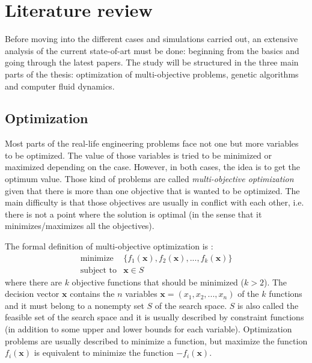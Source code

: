 \chapter{Literature review}
    
    Before moving into the different cases and simulations carried out, an extensive analysis of the current state-of-art must be done: beginning from the basics and going through the latest papers. The study will be structured in the three main parts of the thesis: optimization of multi-objective problems, genetic algorithms and computer fluid dynamics.

\section{Optimization}

    Most parts of the real-life engineering problems face not one but more variables to be optimized. The value of those variables is tried to be minimized or maximized depending on the case. However, in both cases, the idea is to get the optimum value. Those kind of problems are called \textit{multi-objective optimization} given that there is more than one objective that is wanted to be optimized. The main difficulty is that those objectives are usually in conflict with each other, i.e. there is not a point where the solution is optimal (in the sense that it minimizes/maximizes all the objectives).
    
    The formal definition of multi-objective optimization is \cite{nonlinear}:
    \begin{equation}
        \begin{array}{cl}
            \textrm{minimize} & \{f_1(\bm{x}),f_2(\bm{x}),...,f_k(\bm{x})\} \\
            \textrm{subject to} & \bm{x} \in S
        \end{array}
        \label{eq:multiobjectiveDefnition}
    \end{equation}
    where there are $k$ objective functions that should be minimized ($k > 2$). The decision vector $\bm{x}$ contains the $n$ variables $\bm{x}=(x_1,x_2,...,x_n)$ of the $k$ functions and it must belong to a nonempty set $S$ of the search space. $S$ is also called the feasible set of the search space and it is usually described by constraint functions (in addition to some upper and lower bounds for each variable). Optimization problems are usually described to minimize a function, but maximize the function $f_i(\bm{x})$ is equivalent to minimize the function $-f_i(\bm{x})$.
    
